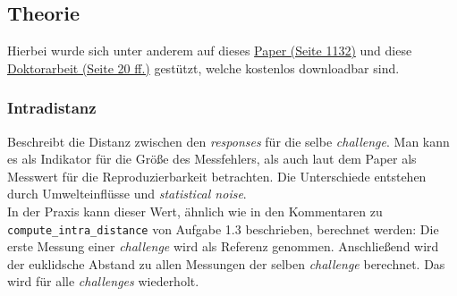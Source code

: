 \subsection{Theorie}

Hierbei wurde sich unter anderem auf dieses 
\href{https://ieeexplore.ieee.org/stamp/%
stamp.jsp?tp=&arnumber=6823677} %
{Paper (Seite 1132)} %
und diese 
\href{https://limo.libis.be/primo-explore/%
fulldisplay?docid=LIRIAS1662210&context%
=L&vid=Lirias&search_scope=Lirias&tab%
=default_tab&lang=en_US&fromSitemap=1}
{Doktorarbeit (Seite 20 ff.)}
gestützt, welche kostenlos downloadbar sind.

\subsubsection*{Intradistanz}
\begin{comment}
VL 5, Folie 36:
Distance between responses for the same challenges. 
Shows measurements error


Doktorarbeit, S.20:
A PUF response intra-distance is a random variable
describing the distance between two PUF responses 
from the same PUF instance and using
the same challenge

Paper, S. 1132:
Intra-PUF variation: Defined as the number of bits
in a PUF response that vary when an identical
challenge is repeatedly queried on a given PUF
device in a changing environment. This variation is
due to this environmental change as well as 
statistical noise. As a result, it is commonly 
represented in the form of a statistical 
distribution. Intra-PUF variation is a measure of 
the reproducibility of responses from an individual 
PUF circuit.
\end{comment}

Beschreibt die Distanz zwischen den
\textit{responses} für die selbe \textit{challenge}. 
Man kann es als Indikator für die Größe des Messfehlers,
als auch laut dem Paper als Messwert für die 
Reproduzierbarkeit betrachten. Die Unterschiede entstehen 
durch Umwelteinflüsse und \textit{statistical noise}.\\

In der Praxis kann dieser Wert, ähnlich wie in 
den Kommentaren zu \verb|compute_intra_distance| 
von Aufgabe 1.3 beschrieben, berechnet werden: Die
erste Messung einer \textit{challenge} wird als Referenz 
genommen. Anschließend wird der euklidsche Abstand zu 
allen Messungen der selben \textit{challenge} berechnet.
Das wird für alle \textit{challenges} wiederholt.


